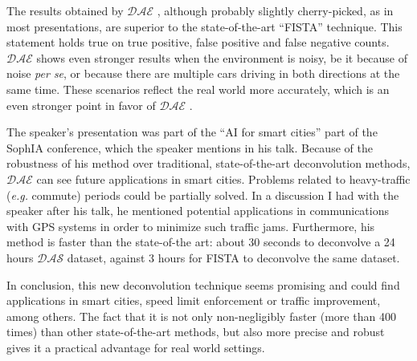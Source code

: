 \documentclass[oneside, 10pt]{article}
\newcommand{\eg}{\textit{e.g. }}
\newcommand{\das}{\ensuremath{\mathcal{DAS}} }
\newcommand{\dae}{\ensuremath{\mathcal{DAE}} }
\begin{document}
The results obtained by \dae, although probably slightly cherry-picked, as in most presentations, are superior to the state-of-the-art ``FISTA'' technique. This statement holds true on true positive, false positive and false negative counts. \dae shows even stronger results when the environment is noisy, be it because of noise \textit{per se}, or because there are multiple cars driving in both directions at the same time. These scenarios reflect the real world more accurately, which is an even stronger point in favor of \dae.

The speaker's presentation was part of the ``AI for smart cities'' part of the SophIA conference, which the speaker mentions in his talk. Because of the robustness of his method over traditional, state-of-the-art deconvolution methods, \dae can see future applications in smart cities. Problems related to heavy-traffic (\eg commute) periods could be partially solved. In a discussion I had with the speaker after his talk, he mentioned potential applications in communications with GPS systems in order to minimize such traffic jams. Furthermore, his method is faster than the state-of-the art: about 30 seconds to deconvolve a 24 hours \das dataset, against 3 hours for FISTA to deconvolve the same dataset.

In conclusion, this new deconvolution technique seems promising and could find applications in smart cities, speed limit enforcement or traffic improvement, among others. The fact that it is not only non-negligibly faster (more than 400 times) than other state-of-the-art methods, but also more precise and robust gives it a practical advantage for real world settings.
\end{document}
